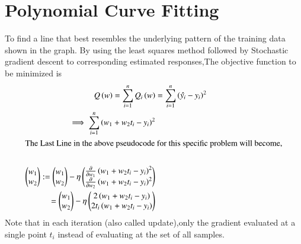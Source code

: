 \documentclass[journal,12pt,twocolumn]{IEEEtran}
\begin{document}
\section{Polynomial Curve Fitting}
To find a line that best resembles the underlying pattern of the training data shown in the graph. By using the least squares method followed by Stochastic gradient descent to corresponding estimated responses,The objective function to be minimized is
\begin{align}
Q\left({w}\right) = \sum_{i=1}^{n} Q_{i}\left(w\right)
&=\sum_{i=1}^{n}\left(\hat{y_{i}}-y_{i}\right)^2\\
\implies \sum_{i=1}^{n}\left(w_{1}+w_{2}t_{i}-y_{i}\right)^2\\
\intertext{The Last Line in the above pseudocode for this specific problem will become,}\\
\begin{pmatrix}w_{1} \\ w_{2}\end{pmatrix}:= \begin{pmatrix}w_{1} \\ w_{2}\end{pmatrix} -\eta \begin{pmatrix} \frac{\partial}{\partial w_{1}}\left(w_{1} + w_{2}t_{i} - y_{i}\right)^2\\ \frac{\partial}{\partial w_{2}}\left(w_{1} + w_{2}t_{i} - y_{i}\right)^2\end{pmatrix}\\
= \begin{pmatrix}w_{1}\\ w_{2}\end{pmatrix}-\eta \begin{pmatrix}2\left(w_{1}+w_{2}t_{i}-y_{i}\right)\\ 2t_{i}\left(w_{1}+w_{2}t_{i}-y_{i}\right)\end{pmatrix}
\end{align}
Note that in each iteration (also called update),only the gradient evaluated at a single point ${\displaystyle t_{i}}$ instead of evaluating at the set of all samples.\\
\end{document}
